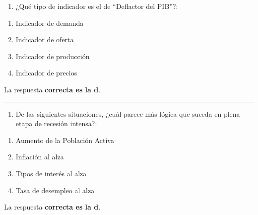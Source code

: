 \documentclass[
  letterpaper,
  DIV=11,
  numbers=noendperiod]{scrreprt}
\providecommand{\tightlist}{%
  \setlength{\itemsep}{0pt}\setlength{\parskip}{0pt}}\usepackage{longtable,booktabs,array}
\begin{document}
\begin{enumerate}
\def\labelenumi{\arabic{enumi}.}
\setcounter{enumi}{56}
\tightlist
\item
  ¿Qué tipo de indicador es el de ``Deflactor del PIB''?:
\end{enumerate}

\begin{enumerate}
\def\labelenumi{\alph{enumi}.}
\item
  Indicador de demanda
\item
  Indicador de oferta
\item
  Indicador de producción
\item
  Indicador de precios
\end{enumerate}

\begin{tcolorbox}[enhanced jigsaw, left=2mm, opacityback=0, colback=white, breakable, arc=.35mm, bottomrule=.15mm, rightrule=.15mm, toprule=.15mm, leftrule=.75mm, colframe=quarto-callout-tip-color-frame]
\begin{minipage}[t]{5.5mm}
\textcolor{quarto-callout-tip-color}{\faLightbulb}
\end{minipage}%
\begin{minipage}[t]{\textwidth - 5.5mm}

La respuesta \textbf{correcta es la d}.

\end{minipage}%
\end{tcolorbox}

\begin{center}\rule{0.5\linewidth}{0.5pt}\end{center}

\begin{enumerate}
\def\labelenumi{\arabic{enumi}.}
\setcounter{enumi}{57}
\tightlist
\item
  De las siguientes situaciones, ¿cuál parece más lógica que suceda en
  plena etapa de recesión intensa?:
\end{enumerate}

\begin{enumerate}
\def\labelenumi{\alph{enumi}.}
\item
  Aumento de la Población Activa
\item
  Inflación al alza
\item
  Tipos de interés al alza
\item
  Tasa de desempleo al alza
\end{enumerate}

\begin{tcolorbox}[enhanced jigsaw, left=2mm, opacityback=0, colback=white, breakable, arc=.35mm, bottomrule=.15mm, rightrule=.15mm, toprule=.15mm, leftrule=.75mm, colframe=quarto-callout-tip-color-frame]
\begin{minipage}[t]{5.5mm}
\textcolor{quarto-callout-tip-color}{\faLightbulb}
\end{minipage}%
\begin{minipage}[t]{\textwidth - 5.5mm}

La respuesta \textbf{correcta es la d}.

\end{minipage}%
\end{tcolorbox}
\end{document}

